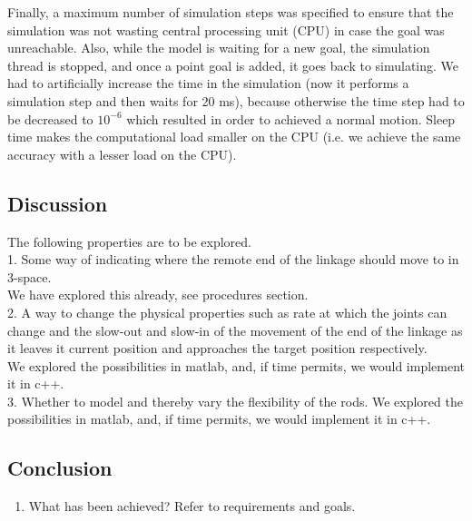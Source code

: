 \documentclass[paper=a4, fontsize=11pt]{scrartcl} %
\numberwithin{equation}{section} %
\numberwithin{figure}{section} %
\numberwithin{table}{section} %
\begin{document}
Finally, a maximum number of simulation steps was specified to ensure that the simulation was not wasting central processing unit (CPU) in case the goal was unreachable. Also, while the model is waiting for a new goal, the simulation thread is stopped, and once a point goal is added, it goes back to simulating. We had to artificially increase the time in the simulation (now it performs a simulation step and then waits for 20 ms), because otherwise the time step had to be decreased to \(10^{-6}\) which resulted in order to achieved a normal motion. Sleep time makes the computational load smaller on the CPU (i.e. we achieve the same accuracy with a lesser load on the CPU). 
  
\subsection{Discussion}
The following properties are to be explored.\\

1. Some way of indicating where the remote end of the linkage should move to in 3-space.\\
We have explored this already, see procedures section.\\

2. A way to change the physical properties such as rate at which the joints can change and the slow-out and slow-in of the movement of the end of the linkage as it leaves it current position and approaches the target position respectively.\\
We explored the possibilities in matlab, and, if time permits, we would implement it in c++.\\


3. Whether to model and thereby vary the flexibility of the rods.
We explored the possibilities in matlab, and, if time permits, we would implement it in c++.\\



\subsection{Conclusion}

\begin{enumerate}
\item What has been achieved? Refer to requirements and goals.
\end{enumerate}
\end{document}
